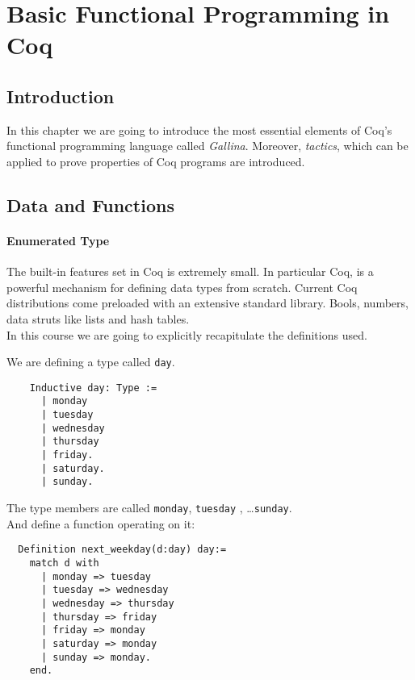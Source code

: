 \section{Basic Functional Programming in Coq}




\subsection{Introduction}

In this chapter we are going to introduce the most essential elements of Coq's functional programming language called {\itshape  Gallina}. 
Moreover, {\itshape tactics}, which can be applied to prove properties of Coq programs are introduced.


\subsection{Data and Functions}

 \paragraph{Enumerated Type}
 
  The built-in features set in Coq is extremely small. In particular Coq, is a powerful mechanism for defining data types from scratch.
  Current Coq distributions come preloaded with an extensive standard library.
  Bools, numbers, data struts like lists and hash tables.\\
  In this course we are going to explicitly recapitulate the definitions used.
   
  
  \begin{example}
  We are defining a type called \lstinline!day!.
  \begin{lstlisting}
    Inductive day: Type :=
	  | monday
	  | tuesday
	  | wednesday
	  | thursday
	  | friday.
	  | saturday.
	  | sunday.
	  \end{lstlisting} 
  
  The type members are called \lstinline!monday!, \lstinline!tuesday! , \ldots \lstinline!sunday!.\\
  
  And define a function operating on it: 
  \begin{lstlisting}
  Definition next_weekday(d:day) day:=
    match d with 
	  | monday => tuesday
	  | tuesday => wednesday
	  | wednesday => thursday
	  | thursday => friday
	  | friday => monday
	  | saturday => monday
	  | sunday => monday.
    end.  
  \end{lstlisting}
  \end{example}

